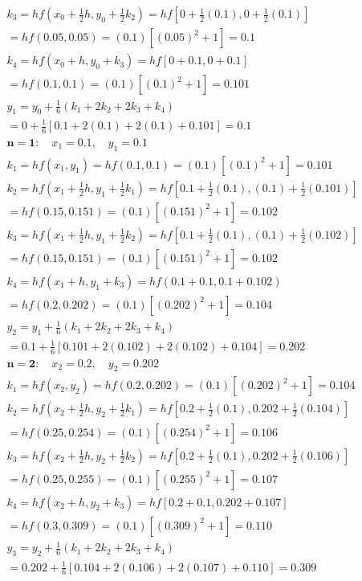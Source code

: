 \documentclass[10pt]{article}
\begin{document}
$$
\begin{aligned}
& k_{3}=h f\left(x_{0}+\frac{1}{2} h, y_{0}+\frac{1}{2} k_{2}\right)=h f\left[0+\frac{1}{2}(0.1), 0+\frac{1}{2}(0.1)\right] \\
& =h f(0.05,0.05)=(0.1)\left[(0.05)^{2}+1\right]=0.1 \\
& k_{4}=h f\left(x_{0}+h, y_{0}+k_{3}\right)=h f[0+0.1,0+0.1] \\
& =h f(0.1,0.1)=(0.1)\left[(0.1)^{2}+1\right]=0.101 \\
& y_{1}=y_{0}+\frac{1}{6}\left(k_{1}+2 k_{2}+2 k_{3}+k_{4}\right) \\
& =0+\frac{1}{6}[0.1+2(0.1)+2(0.1)+0.101]=0.1 \\
& \boldsymbol{n}=\mathbf{1}: \quad x_{1}=0.1, \quad y_{1}=0.1 \\
& k_{1}=h f\left(x_{1}, y_{1}\right)=h f(0.1,0.1)=(0.1)\left[(0.1)^{2}+1\right]=0.101 \\
& k_{2}=h f\left(x_{1}+\frac{1}{2} h, y_{1}+\frac{1}{2} k_{1}\right)=h f\left[0.1+\frac{1}{2}(0.1),(0.1)+\frac{1}{2}(0.101)\right] \\
& =h f(0.15,0.151)=(0.1)\left[(0.151)^{2}+1\right]=0.102 \\
& k_{3}=h f\left(x_{1}+\frac{1}{2} h, y_{1}+\frac{1}{2} k_{2}\right)=h f\left[0.1+\frac{1}{2}(0.1),(0.1)+\frac{1}{2}(0.102)\right] \\
& =h f(0.15,0.151)=(0.1)\left[(0.151)^{2}+1\right]=0.102 \\
& k_{4}=h f\left(x_{1}+h, y_{1}+k_{3}\right)=h f(0.1+0.1,0.1+0.102) \\
& =h f(0.2,0.202)=(0.1)\left[(0.202)^{2}+1\right]=0.104 \\
& y_{2}=y_{1}+\frac{1}{6}\left(k_{1}+2 k_{2}+2 k_{3}+k_{4}\right) \\
& =0.1+\frac{1}{6}[0.101+2(0.102)+2(0.102)+0.104]=0.202 \\
& \boldsymbol{n}=\mathbf{2}: \quad x_{2}=0.2, \quad y_{2}=0.202 \\
& k_{1}=h f\left(x_{2}, y_{2}\right)=h f(0.2,0.202)=(0.1)\left[(0.202)^{2}+1\right]=0.104 \\
& k_{2}=h f\left(x_{2}+\frac{1}{2} h, y_{2}+\frac{1}{2} k_{1}\right)=h f\left[0.2+\frac{1}{2}(0.1), 0.202+\frac{1}{2}(0.104)\right] \\
& =h f(0.25,0.254)=(0.1)\left[(0.254)^{2}+1\right]=0.106 \\
& k_{3}=h f\left(x_{2}+\frac{1}{2} h, y_{2}+\frac{1}{2} k_{2}\right)=h f\left[0.2+\frac{1}{2}(0.1), 0.202+\frac{1}{2}(0.106)\right] \\
& =h f(0.25,0.255)=(0.1)\left[(0.255)^{2}+1\right]=0.107 \\
& k_{4}=h f\left(x_{2}+h, y_{2}+k_{3}\right)=h f[0.2+0.1,0.202+0.107] \\
& =h f(0.3,0.309)=(0.1)\left[(0.309)^{2}+1\right]=0.110 \\
& y_{3}=y_{2}+\frac{1}{6}\left(k_{1}+2 k_{2}+2 k_{3}+k_{4}\right) \\
& =0.202+\frac{1}{6}[0.104+2(0.106)+2(0.107)+0.110]=0.309
\end{aligned}
$$
\end{document}
